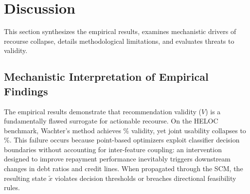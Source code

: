 \documentclass[nolineno]{paper/ieee-access/ieeeaccess}%
\newcommand{\CAC}{CAC}
\begin{document}
\section{Discussion}
\label{sec:discussion}
This section synthesizes the empirical results, examines mechanistic drivers of recourse collapse, details methodological limitations, and evaluates threats to validity.

\subsection{Mechanistic Interpretation of Empirical Findings}
The empirical results demonstrate that recommendation validity ($V$) is a fundamentally flawed surrogate for actionable recourse. On the HELOC benchmark, Wachter's method achieves \HelocWachterValidity\% validity, yet joint usability collapses to \HelocWachterUsable\%. This failure occurs because point-based optimizers exploit classifier decision boundaries without accounting for inter-feature coupling: an intervention designed to improve repayment performance inevitably triggers downstream changes in debt ratios and credit lines. When propagated through the SCM, the resulting state $\widetilde{x}$ violates decision thresholds or breaches directional feasibility rules.

\begin{table}[t]
\caption{\CAC{} plans checked with equations fitted again. $U$ uses all
queried applicants as its total. $^{*}$Survival uses a different total:
it is the percentage of valid suggested records still accepted after replay.
The checking model reuses part of the training data used to generate plans.}
\label{tab:refit}
\centering\footnotesize

\end{table}

\begin{table}[!t]
\caption{Saved results for the artificial worlds. $U$ is the percentage of
applicants with a usable plan under the fitted SCM (own) and known SCM
(truth). $^{*}$Survival counts valid suggestions, not all applicants.
Cost is the mean effort of the cheapest truth-usable plan for each successful
applicant. We check these values against the saved summary. Individual
artificial-world plans were not saved, so fresh replay is not possible.}
\label{tab:known}
\centering\footnotesize\setlength{\tabcolsep}{3pt}

\end{table}

\begin{table}[!t]
\caption{Saved graph checks. ``Actions'' counts feature nodes that can be
changed. ``Supported'' is the number of supported chosen links over all
chosen links. ``CI upheld'' gives the saved conditional-independence test
count. These checks test patterns in observed data, not prove causal direction.}
\label{tab:scm}
\centering\footnotesize

\end{table}
\end{document}

